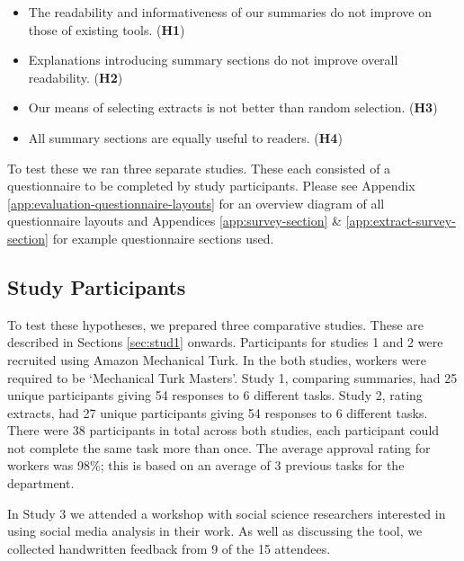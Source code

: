     \begin{itemize}
      \item{The readability and informativeness of our summaries do not improve on those of existing tools. (\textbf{H1})}
      \item{Explanations introducing summary sections do not improve overall readability. (\textbf{H2})}
      \item{Our means of selecting extracts is not better than random selection. (\textbf{H3})}
      \item{All summary sections are equally useful to readers. (\textbf{H4})}
    \end{itemize}

    To test these we ran three separate studies. These each consisted of a questionnaire to be completed by study participants. Please see Appendix \ref{app:evaluation-questionnaire-layouts} for an overview diagram of all questionnaire layouts and Appendices \ref{app:survey-section} \& \ref{app:extract-survey-section} for example questionnaire sections used.

    \tocless\subsection{Study Participants}
      To test these hypotheses, we prepared three comparative studies. These are described in Sections \ref{sec:stud1} onwards. Participants for studies 1 and 2 were recruited using Amazon Mechanical Turk. In the both studies, workers were required to be `Mechanical Turk Masters'. Study 1, comparing summaries, had 25 unique participants giving 54 responses to 6 different tasks. Study 2, rating extracts, had 27 unique participants giving 54 responses to 6 different tasks. There were 38 participants in total across both studies, each participant could not complete the same task more than once. The average approval rating for workers was 98\%; this is based on an average of 3 previous tasks for the department.

      In Study 3 we attended a workshop with social science researchers interested in using social media analysis in their work. As well as discussing the tool, we collected handwritten feedback from 9 of the 15 attendees.

